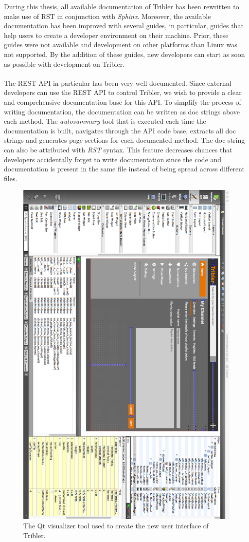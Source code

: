 During this thesis, all available documentation of Tribler has been rewritten to make use of RST in conjunction with \emph{Sphinx}. Moreover, the available documentation has been improved with several guides, in particular, guides that help users to create a developer environment on their machine. Prior, these guides were not available and development on other platforms than Linux was not supported. By the addition of these guides, new developers can start as soon as possible with development on Tribler.\\\\
The REST API in particular has been very well documented. Since external developers can use the REST API to control Tribler, we wish to provide a clear and comprehensive documentation base for this API. To simplify the process of writing documentation, the documentation can be written as doc strings above each method. The \emph{autosummary} tool that is executed each time the documentation is built, navigates through the API code base, extracts all doc strings and generates page sections for each documented method. The doc string can also be attributed with \emph{RST} syntax. This feature decreases chances that developers accidentally forget to write documentation since the code and documentation is present in the same file instead of being spread across different files.

\begin{figure}[t]
	\centering
	\includegraphics[width=1.0\columnwidth]{images/improving_qa/qt_designer}
	\caption{The Qt visualizer tool used to create the new user interface of Tribler.}
	\label{fig:qt-visualizer}
\end{figure}